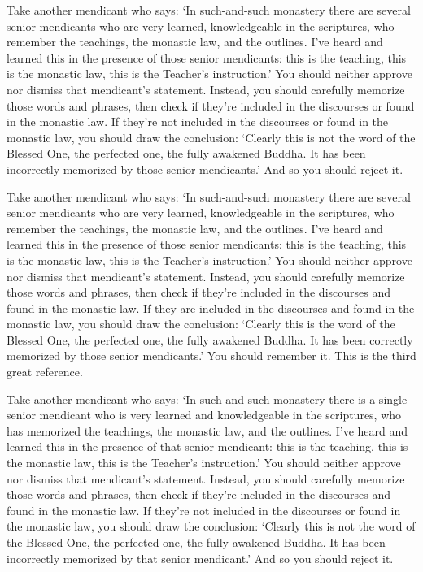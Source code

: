 \documentclass[12pt,openany]{book}%
\begin{document}
Take another mendicant who says: ‘In such-and-such monastery there are several senior mendicants who are very learned, knowledgeable in the scriptures, who remember the teachings, the monastic law, and the outlines. I’ve heard and learned this in the presence of those senior mendicants: this is the teaching, this is the monastic law, this is the Teacher’s instruction.’ You should neither approve nor dismiss that mendicant’s statement. Instead, you should carefully memorize those words and phrases, then check if they’re included in the discourses or found in the monastic law. If they’re not included in the discourses or found in the monastic law, you should draw the conclusion: ‘Clearly this is not the word of the Blessed One, the perfected one, the fully awakened Buddha. It has been incorrectly memorized by those senior mendicants.’ And so you should reject it. 

Take another mendicant who says: ‘In such-and-such monastery there are several senior mendicants who are very learned, knowledgeable in the scriptures, who remember the teachings, the monastic law, and the outlines. I’ve heard and learned this in the presence of those senior mendicants: this is the teaching, this is the monastic law, this is the Teacher’s instruction.’ You should neither approve nor dismiss that mendicant’s statement. Instead, you should carefully memorize those words and phrases, then check if they’re included in the discourses and found in the monastic law. If they are included in the discourses and found in the monastic law, you should draw the conclusion: ‘Clearly this is the word of the Blessed One, the perfected one, the fully awakened Buddha. It has been correctly memorized by those senior mendicants.’ You should remember it. This is the third great reference. 

Take another mendicant who says: ‘In such-and-such monastery there is a single senior mendicant who is very learned and knowledgeable in the scriptures, who has memorized the teachings, the monastic law, and the outlines. I’ve heard and learned this in the presence of that senior mendicant: this is the teaching, this is the monastic law, this is the Teacher’s instruction.’ You should neither approve nor dismiss that mendicant’s statement. Instead, you should carefully memorize those words and phrases, then check if they’re included in the discourses and found in the monastic law. If they’re not included in the discourses or found in the monastic law, you should draw the conclusion: ‘Clearly this is not the word of the Blessed One, the perfected one, the fully awakened Buddha. It has been incorrectly memorized by that senior mendicant.’ And so you should reject it. 
\end{document}
